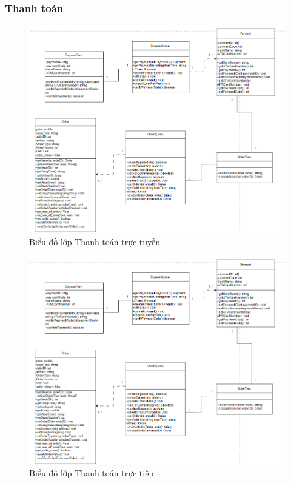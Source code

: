 \subsubsection{Thanh toán}
\begin{figure}[H]
    \centering
    \includegraphics[width=\textwidth]{img3.4.2/3.4.2thanhtoanbangtk.png} 
    \caption{Biểu đồ lớp Thanh toán trực tuyến}
\end{figure}

\begin{figure}[H]
    \centering
    \includegraphics[width=\textwidth]{img3.4.2/3.4.2thanhtoantructiep.png} 
    \caption{Biểu đồ lớp Thanh toán trực tiếp}
\end{figure}

